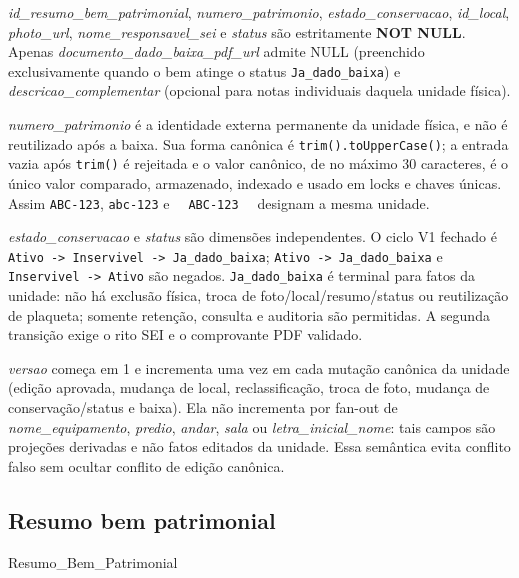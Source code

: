 \begin{explicacao}
\textit{id\_resumo\_bem\_patrimonial}, \textit{numero\_patrimonio}, \textit{estado\_conservacao}, \textit{id\_local}, \textit{photo\_url}, \textit{nome\_responsavel\_sei} e \textit{status} são estritamente \textbf{NOT NULL}. Apenas \textit{documento\_dado\_baixa\_pdf\_url} admite NULL (preenchido exclusivamente quando o bem atinge o status \texttt{Ja\_dado\_baixa}) e \textit{descricao\_complementar} (opcional para notas individuais daquela unidade física).
\end{explicacao}

\begin{regra}
\textit{numero\_patrimonio} é a identidade externa permanente da unidade física,
e não é reutilizado após a baixa. Sua forma canônica é
\texttt{trim().toUpperCase()}; a entrada vazia após \texttt{trim()} é rejeitada e
o valor canônico, de no máximo 30 caracteres, é o único valor comparado,
armazenado, indexado e usado em locks e chaves únicas. Assim \texttt{ABC-123},
\texttt{abc-123} e \texttt{\ \ ABC-123\ \ } designam a mesma unidade.

\textit{estado\_conservacao} e \textit{status} são dimensões independentes. O
ciclo V1 fechado é \texttt{Ativo -> Inservivel -> Ja\_dado\_baixa};
\texttt{Ativo -> Ja\_dado\_baixa} e \texttt{Inservivel -> Ativo} são negados.
\texttt{Ja\_dado\_baixa} é terminal para fatos da unidade: não há exclusão física,
troca de foto/local/resumo/status ou reutilização de plaqueta; somente retenção,
consulta e auditoria são permitidas. A segunda transição exige o rito SEI e o
comprovante PDF validado.

\textit{versao} começa em 1 e incrementa uma vez em cada mutação canônica da
unidade (edição aprovada, mudança de local, reclassificação, troca de foto,
mudança de conservação/status e baixa). Ela não incrementa por fan-out de
\textit{nome\_equipamento}, \textit{predio}, \textit{andar}, \textit{sala} ou
\textit{letra\_inicial\_nome}: tais campos são projeções derivadas e não fatos
editados da unidade. Essa semântica evita conflito falso sem ocultar conflito
de edição canônica.
\end{regra}

\subsection{Resumo bem patrimonial}
\begin{entidade}{Resumo\_Bem\_Patrimonial}
\end{entidade}

